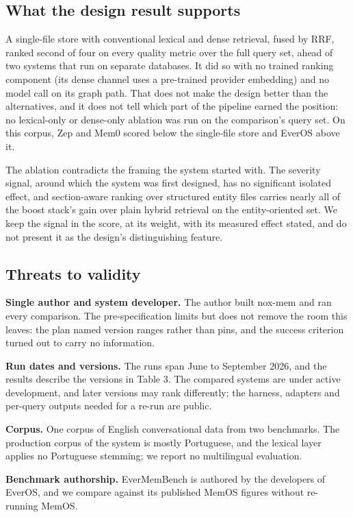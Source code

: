 \documentclass[a4paper,fleqn]{cas-sc}
\begin{document}
\subsection{What the design result supports}

A single-file store with conventional lexical and dense retrieval, fused by RRF, ranked second of four on every quality metric over the full query set, ahead of two systems that run on separate databases. It did so with no trained ranking component (its dense channel uses a pre-trained provider embedding) and no model call on its graph path. That does not make the design better than the alternatives, and it does not tell which part of the pipeline earned the position: no lexical-only or dense-only ablation was run on the comparison's query set. On this corpus, Zep and Mem0 scored below the single-file store and EverOS above it.

The ablation contradicts the framing the system started with. The severity signal, around which the system was first designed, has no significant isolated effect, and section-aware ranking over structured entity files carries nearly all of the boost stack's gain over plain hybrid retrieval on the entity-oriented set. We keep the signal in the score, at its weight, with its measured effect stated, and do not present it as the design's distinguishing feature.

\subsection{Threats to validity}

\textbf{Single author and system developer.} The author built nox-mem and ran every comparison. The pre-specification limits but does not remove the room this leaves: the plan named version ranges rather than pins, and the success criterion turned out to carry no information.

\textbf{Run dates and versions.} The runs span June to September 2026, and the results describe the versions in Table 3. The compared systems are under active development, and later versions may rank differently; the harness, adapters and per-query outputs needed for a re-run are public.

\textbf{Corpus.} One corpus of English conversational data from two benchmarks. The production corpus of the system is mostly Portuguese, and the lexical layer applies no Portuguese stemming; we report no multilingual evaluation.

\textbf{Benchmark authorship.} EverMemBench is authored by the developers of EverOS, and we compare against its published MemOS figures without re-running MemOS.
\end{document}
